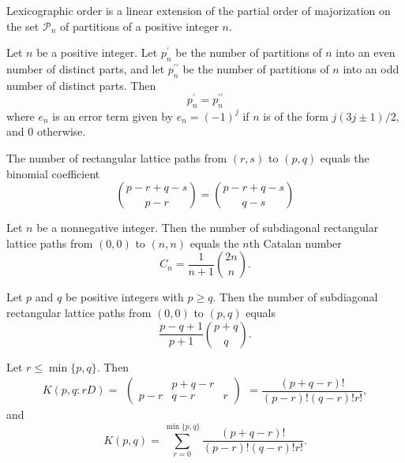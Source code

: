 \begin{theorem}
  \label{thm:8.3.5}
  Lexicographic order is a linear extension of the partial order of majorization on the set 
  $\mathcal{P}_n$ of partitions of a positive integer $n$.
\end{theorem}

\begin{theorem}
  \label{thm:8.3.6}
  Let $n$ be a positive integer. Let $p_n^{\prime}$ be the number of partitions of $n$ into an even 
  number of distinct parts, and let $p_n^{\prime\prime}$ be the number of partitions of $n$ into an 
  odd number of distinct parts. Then
  \[ p_n^{\prime} = p_n^{\prime\prime} \]
  where $e_n$ is an error term given by $e_n = (-1)^j$ if $n$ is of the form $j(3j\pm 1)/2$, and 0 
  otherwise.
\end{theorem}

\begin{theorem}
  \label{thm:8.5.1}
  The number of rectangular lattice paths from $(r, s)$ to $(p, q)$ equals the binomial coefficient
  \[ \binom{p-r+q-s}{p-r} = \binom{p-r+q-s}{q-s} \]
\end{theorem}

\begin{theorem}
  \label{thm:8.5.2}
  Let $n$ be a nonnegative integer. Then the number of subdiagonal rectangular lattice paths from 
  $(0,0)$ to $(n, n)$ equals the $n$th Catalan number
  \[ C_n = \frac{1}{n+1}\binom{2n}{n}. \]
\end{theorem}

\begin{theorem}
  \label{thm:8.5.3}
  Let $p$ and $q$ be positive integers with $p \geq q$. Then the number of subdiagonal rectangular 
  lattice paths from $(0,0)$ to $(p, q)$ equals
  \[ \frac{p-q+1}{p+1}\binom{p+q}{q}. \]
\end{theorem}

\begin{theorem}
  \label{thm:8.5.4}
  Let $r \leq \min\{p, q\}$. Then 
  \[ K(p, q : rD) = \begin{eqnarray}
    \begin{pmatrix}
       & p+q-r & \\
      p-r & q-r & r 
    \end{pmatrix}
  \end{eqnarray} = \frac{(p+q-r)!}{(p-r)!(q-r)!r!}, \]
  and 
  \[ K(p,q) = \sum\limits_{r=0}^{\min\{p, q\}}\frac{(p+q-r)!}{(p-r)!(q-r)!r!}. \]
\end{theorem}

